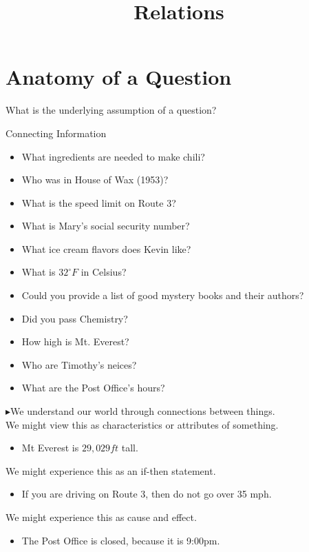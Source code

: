 \documentclass{ximera}
\title{Relations}
\begin{document}
\begin{abstract}

\end{abstract}
\maketitle



\section{Anatomy of a Question}


What is the underlying assumption of a question?


\begin{observation} Connecting Information

\begin{itemize} 
\item What ingredients are needed to make chili?
\item Who was in House of Wax (1953)?
\item What is the speed limit on Route 3?
\item What is Mary's social security number?
\item What ice cream flavors does Kevin like?
\item What is $32^\circ F$ in Celsius?
\item Could you provide a list of good mystery books and their authors?
\item Did you pass Chemistry?
\item How high is Mt. Everest?
\item Who are Timothy's neices?
\item What are the Post Office's hours?
\end{itemize}

$\blacktriangleright$We understand our world through connections between things. \\


We might view this as characteristics or attributes of something. 
\begin{itemize}
\item Mt Everest is $29,029 ft$ tall.
\end{itemize}


We might experience this as an if-then statement.
\begin{itemize}
\item If you are driving on Route 3, then do not go over 35 mph.
\end{itemize}



We might experience this as cause and effect.
\begin{itemize}
\item The Post Office is closed, because it is 9:00pm.
\end{itemize}

\end{observation}
\end{document}
